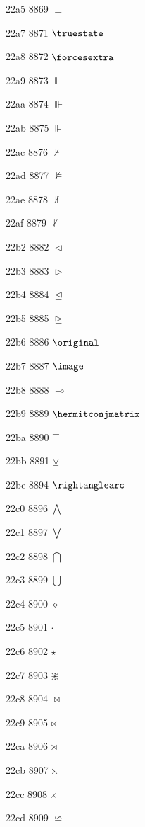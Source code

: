 \documentclass[11pt]{article}
\begin{document}
22a5 8869 \ensuremath{\perp}

22a7 8871 \ensuremath{\truestate}

22a8 8872 \ensuremath{\forcesextra}

22a9 8873 \ensuremath{\Vdash}

22aa 8874 \ensuremath{\Vvdash}

22ab 8875 \ensuremath{\VDash}

22ac 8876 \ensuremath{\nvdash}

22ad 8877 \ensuremath{\nvDash}

22ae 8878 \ensuremath{\nVdash}

22af 8879 \ensuremath{\nVDash}

22b2 8882 \ensuremath{\vartriangleleft}

22b3 8883 \ensuremath{\vartriangleright}

22b4 8884 \ensuremath{\trianglelefteq}

22b5 8885 \ensuremath{\trianglerighteq}

22b6 8886 \ensuremath{\original}

22b7 8887 \ensuremath{\image}

22b8 8888 \ensuremath{\multimap}

22b9 8889 \ensuremath{\hermitconjmatrix}

22ba 8890 \ensuremath{\intercal}

22bb 8891 \ensuremath{\veebar}

22be 8894 \ensuremath{\rightanglearc}

22c0 8896 \ensuremath{\bigwedge}

22c1 8897 \ensuremath{\bigvee}

22c2 8898 \ensuremath{\bigcap}

22c3 8899 \ensuremath{\bigcup}

22c4 8900 \ensuremath{\diamond}

22c5 8901 \ensuremath{\cdot}

22c6 8902 \ensuremath{\star}

22c7 8903 \ensuremath{\divideontimes}

22c8 8904 \ensuremath{\bowtie}

22c9 8905 \ensuremath{\ltimes}

22ca 8906 \ensuremath{\rtimes}

22cb 8907 \ensuremath{\leftthreetimes}

22cc 8908 \ensuremath{\rightthreetimes}

22cd 8909 \ensuremath{\backsimeq}
\end{document}
